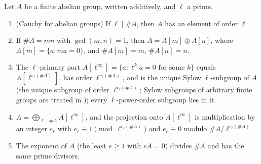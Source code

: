 \begin{proposition}\label{prop:groups:lprimary}
Let $A$ be a finite abelian group, written additively, and $\ell$ a prime.
\begin{enumerate}[label=(\roman*)]
\item (Cauchy for abelian groups) If $\ell\mid\#A$, then $A$ has an element of order $\ell$.
\item If $\#A=mn$ with $\gcd(m,n)=1$, then $A=A[m]\oplus A[n]$, where $A[m]=\{a:ma=0\}$, and $\#A[m]=m$, $\#A[n]=n$.
\item The $\ell$-primary part $A[\ell^\infty]=\{a:\ell^ka=0\text{ for some }k\}$ equals $A[\ell^{v_\ell(\#A)}]$, has order $\ell^{v_\ell(\#A)}$, and is the unique
Sylow $\ell$-subgroup of $A$ (the unique subgroup of order $\ell^{v_\ell(\#A)}$; Sylow subgroups of arbitrary finite groups are
treated in ); every $\ell$-power-order subgroup lies in it.
\item $A=\bigoplus_{\ell\mid\#A}A[\ell^\infty]$, and the projection onto $A[\ell^\infty]$ is multiplication by an integer $e_\ell$ with $e_\ell\equiv1\pmod{\ell^{v_\ell(\#A)}}$
and $e_\ell\equiv0$ modulo $\#A/\ell^{v_\ell(\#A)}$.
\item The exponent of $A$ (the least $e\ge1$ with $eA=0$) divides $\#A$ and has the same prime divisors.
\end{enumerate}
\end{proposition}

